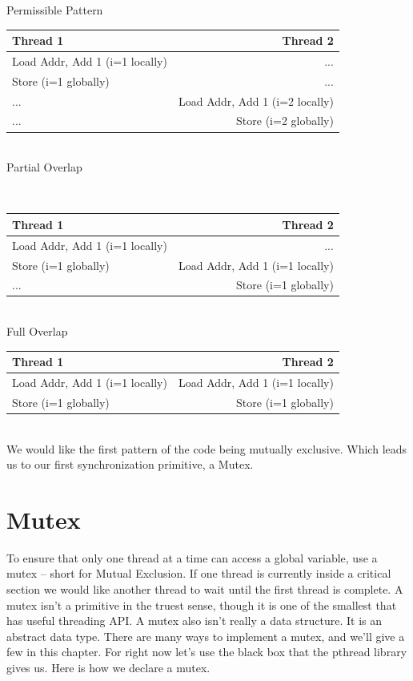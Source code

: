 Permissible Pattern
\\
\begin{center}
\begin{tabular}{ l | r }
  Thread 1 & Thread 2 \\ \hline
  Load Addr, Add 1 (i=1 locally) & ...  \\
  Store (i=1 globally) & ...  \\
  ... & Load Addr, Add 1 (i=2 locally)  \\
  ... & Store (i=2 globally)  \\
\end{tabular}
\end{center}
\\
Partial Overlap

\\
\begin{center}
\begin{tabular}{ l | r }
Thread 1 & Thread 2 \\ \hline
Load Addr, Add 1 (i=1 locally) & ... \\
Store (i=1 globally) & Load Addr, Add 1 (i=1 locally) \\
... & Store (i=1 globally) \\
\end{tabular}
\end{center}
\\

Full Overlap
\\
\begin{center}
\begin{tabular}{ l | r }
Thread 1 & Thread 2 \\ \hline
Load Addr, Add 1 (i=1 locally) & Load Addr, Add 1 (i=1 locally) \\
Store (i=1 globally) & Store (i=1 globally) \\
\end{tabular}
\end{center}
\\
We would like the first pattern of the code being mutually exclusive.
Which leads us to our first synchronization primitive, a Mutex.

\section{Mutex}

To ensure that only one thread at a time can access a global variable, use a mutex -- short for Mutual Exclusion.
If one thread is currently inside a critical section we would like another thread to wait until the first thread is complete.
A mutex isn't a primitive in the truest sense, though it is one of the smallest that has useful threading API.
A mutex also isn't really a data structure.
It is an abstract data type.
There are many ways to implement a mutex, and we'll give a few in this chapter.
For right now let's use the black box that the pthread library gives us.
Here is how we declare a mutex.

